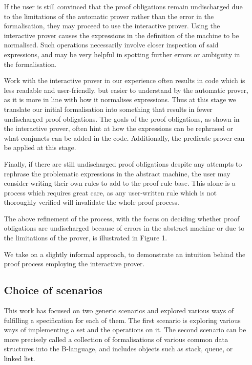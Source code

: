 \documentclass[12pt,journal,duplex]{IEEEtran}
\begin{document}
	If the user is still convinced that the proof obligations remain undischarged due to the limitations of the automatic prover rather than the error in the formalisation, they may proceed to use the interactive prover. Using the interactive prover causes the expressions in the definition of the machine to be normalised. Such operations necessarily involve closer inspection of said expressions, and may be very helpful in spotting further errors or ambiguity in the formalisation.

	Work with the interactive prover in our experience often results in code which is less readable and user-friendly, but easier to understand by the automatic prover, as it is more in line with how it normalises expressions. Thus at this stage we translate our initial formalisation into something that results in fewer undischarged proof obligations. The goals of the proof obligations, as shown in the interactive prover, often hint at how the expressions can be rephrased or what conjuncts can be added in the code. Additionally, the predicate prover can be applied at this stage.

	Finally, if there are still undischarged proof obligations despite any attempts to rephrase the problematic expressions in the abstract machine, the user may consider writing their own rules to add to the proof rule base. This alone is a process which requires great care, as any user-written rule which is not thoroughly verified will invalidate the whole proof process.

	The above refinement of the process, with the focus on deciding whether proof obligations are undischarged because of errors in the abstract machine or due to the limitations of the prover, is illustrated in Figure 1.

	We take on a slightly informal approach, to demonstrate an intuition behind the proof process employing the interactive prover.

	\subsection{Choice of scenarios}
	This work has focused on two generic scenarios and explored various ways of fulfilling a specification for each of them. The first scenario is exploring various ways of implementing a set and the operations on it. The second scenario can be more precisely called a collection of formalisations of various common data structures into the B-language, and includes objects such as stack, queue, or linked list.
\end{document}
